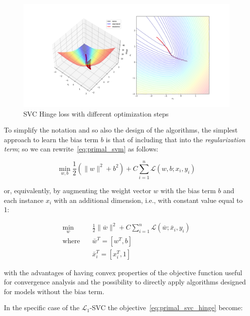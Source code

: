 \begin{figure}[h!]
	\centering
  	\includegraphics[scale=0.4]{img/svc_hinge_loss}
  	\caption{SVC Hinge loss with different optimization steps}
  	\label{fig:svc_hinge_loss}
\end{figure}

To simplify the notation and so also the design of the algorithms, the simplest approach to learn the bias term $b$ is that of including that into the \emph{regularization term}; so we can rewrite~\eqref{eq:primal_svm} as follows:

\begin{equation} \label{eq:biased_primal_svm1}
    \min_{w,b} \frac{1}{2} (\| w \|^2 + b^2) + C \sum_{i=1}^n \mathcal{L}(w,b;x_i,y_i)
\end{equation}

or, equivalently, by augmenting the weight vector $w$ with the bias term $b$ and each instance $x_i$ with an additional dimension, i.e., with constant value equal to 1:

\begin{equation} \label{eq:biased_primal_svm2}
    \begin{aligned}
        \min_{w} \quad & \frac{1}{2} \| \bar{w} \|^2 + C \sum_{i=1}^n \mathcal{L}(\bar{w};\bar{x}_i,y_i) \\
            \text{where} \quad & \bar{w}^T = [w^T, b] \\ & \bar{x}_i^T = [x_i^T, 1]
    \end{aligned}
\end{equation}

with the advantages of having convex properties of the objective function useful for convergence analysis and the possibility to directly apply algorithms designed for models without the bias term.

In the specific case of the $\mathcal{L}_1$-SVC the objective~\eqref{eq:primal_svc_hinge} become:


